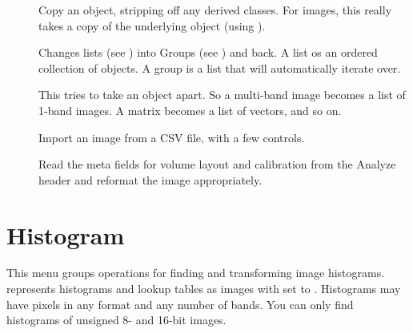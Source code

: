 \begin{description}

\item[]
	Copy an object, stripping off any derived classes. For images, this
	really takes a copy of the underlying object (using ).

\item[]
	Changes lists (see ) into Groups (see
	) and back. A list os an ordered collection of
	objects. A group is a list that \nip{} will automatically iterate
	over.

\item[]
	This tries to take an object apart. So a multi-band image becomes a
	list of 1-band images. A matrix becomes a list of vectors, and so on.

\item[]
	Import an image from a CSV file, with a few controls.

\item[]
	Read the meta fields for volume layout and calibration from the
	Analyze header and reformat the image appropriately.

\end{description}

\section{Histogram}

This menu groups operations for finding and transforming image histograms.
\nip{} represents histograms and lookup tables as images with 
set to .  Histograms may have pixels in any format and any
number of bands. You can only find histograms of unsigned 8- and 16-bit
images.

